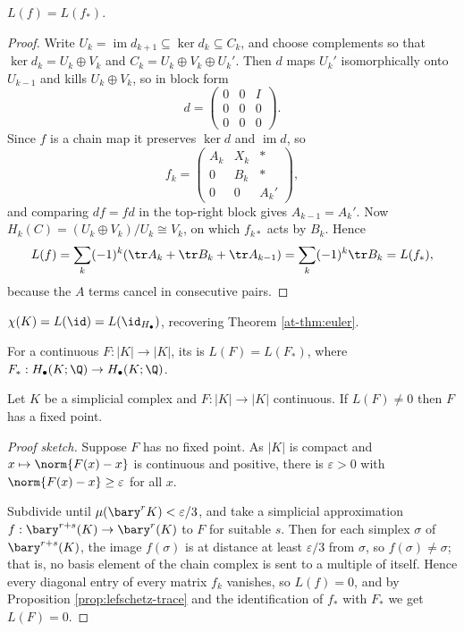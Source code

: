 \begin{proposition} \label{prop:lefschetz-trace}
	$L(f) = L(f_*)$.
\end{proposition}
\begin{proof}
	Write $U_k = \operatorname{im}d_{k+1}\subseteq \ker d_k\subseteq C_k$, and choose complements so that $\ker d_k = U_k\oplus V_k$ and $C_k = U_k\oplus V_k\oplus U_k'$. Then $d$ maps $U_k'$ isomorphically onto $U_{k-1}$ and kills $U_k\oplus V_k$, so in block form
	$$
	d = \begin{pmatrix}0&0&I\\0&0&0\\0&0&0\end{pmatrix}.
	$$
	Since $f$ is a chain map it preserves $\ker d$ and $\operatorname{im}d$, so
	$$
	f_k = \begin{pmatrix}A_k & X_k & *\\ 0 & B_k & *\\ 0&0&A_k'\end{pmatrix},
	$$
	and comparing $df = fd$ in the top-right block gives $A_{k-1} = A_k'$. Now $H_k(C) = (U_k\oplus V_k)/U_k \cong V_k$, on which $f_{k*}$ acts by $B_k$. Hence
	$$
	L(f) = \sum_k(-1)^k(\tr A_k + \tr B_k + \tr A_{k-1}) = \sum_k(-1)^k\tr B_k = L(f_*),
	$$
	because the $A$ terms cancel in consecutive pairs.
\end{proof}

\begin{corollary}
	$\chi(K) = L(\id) = L(\id_{H_\bullet})$, recovering Theorem \ref{at-thm:euler}.
\end{corollary}

\begin{definition}
	For a continuous $F: |K|\to|K|$, its  is $L(F) = L(F_*)$, where $F_*: H_\bullet(K;\Q)\to H_\bullet(K;\Q)$.
\end{definition}

\begin{theorem} \label{thm:lefschetz}
	Let $K$ be a simplicial complex and $F: |K|\to|K|$ continuous. If $L(F)\neq 0$ then $F$ has a fixed point.
\end{theorem}
\begin{proof}[Proof sketch]
	Suppose $F$ has no fixed point. As $|K|$ is compact and $x \mapsto \norm{F(x)-x}$ is continuous and positive, there is $\varepsilon>0$ with $\norm{F(x)-x}\geq\varepsilon$ for all $x$.

	Subdivide until $\mu(\bary^r K) < \varepsilon/3$, and take a simplicial approximation $f: \bary^{r+s}(K)\to\bary^r(K)$ to $F$ for suitable $s$. Then for each simplex $\sigma$ of $\bary^{r+s}(K)$, the image $f(\sigma)$ is at distance at least $\varepsilon/3$ from $\sigma$, so $f(\sigma)\neq\sigma$; that is, no basis element of the chain complex is sent to a multiple of itself. Hence every diagonal entry of every matrix $f_k$ vanishes, so $L(f) = 0$, and by Proposition \ref{prop:lefschetz-trace} and the identification of $f_*$ with $F_*$ we get $L(F) = 0$.
\end{proof}

